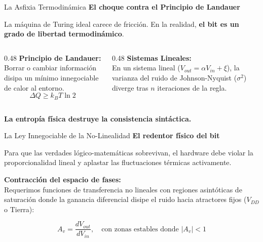 \documentclass[10pt, aspectratio=169]{beamer}
\begin{document}
\begin{frame}{La Asfixia Termodinámica}
    \vspace{0.2cm}
    \Large \textbf{El choque contra el Principio de Landauer}
    
    \vspace{0.4cm}
    \normalsize
    La máquina de Turing ideal carece de fricción. En la realidad, \textbf{el bit es un grado de libertad termodinámico}.
    
    \vspace{0.4cm}
    \begin{columns}
        \begin{column}{0.48\textwidth}
            \alert{\textbf{Principio de Landauer:}} \\
            \vspace{0.1cm}
            \small Borrar o cambiar información disipa un mínimo innegociable de calor al entorno.
            \Large
            $$\Delta Q \ge k_B T \ln 2$$
        \end{column}
        \begin{column}{0.48\textwidth}
            \alert{\textbf{Sistemas Lineales:}} \\
            \vspace{0.1cm}
            \small En un sistema lineal ($V_{out} = \alpha V_{in} + \xi$), la varianza del ruido de Johnson-Nyquist ($\sigma^2$) diverge tras $n$ iteraciones de la regla.
        \end{column}
    \end{columns}
    
    \vspace{0.6cm}
    \begin{center}
        \textbf{\color{diagonalred} La entropía física destruye la consistencia sintáctica.}
    \end{center}
\end{frame}


\begin{frame}{La Ley Innegociable de la No-Linealidad}
    \vspace{0.3cm}
    \Large \textbf{El redentor físico del bit}
    
    \vspace{0.4cm}
    \normalsize
    Para que las verdades lógico-matemáticas sobrevivan, el hardware debe violar la proporcionalidad lineal y aplastar las fluctuaciones térmicas activamente.
    
    \vspace{0.4cm}
    \alert{\textbf{Contracción del espacio de fases:}} \\
    Requerimos funciones de transferencia no lineales con regiones asintóticas de saturación donde la ganancia diferencial disipe el ruido hacia atractores fijos ($V_{DD}$ o Tierra):
    
    \vspace{0.3cm}
    \Large
    $$A_v = \frac{dV_{out}}{dV_{in}}, \quad \text{con zonas estables donde } |A_v| < 1$$
\end{frame}
\end{document}
